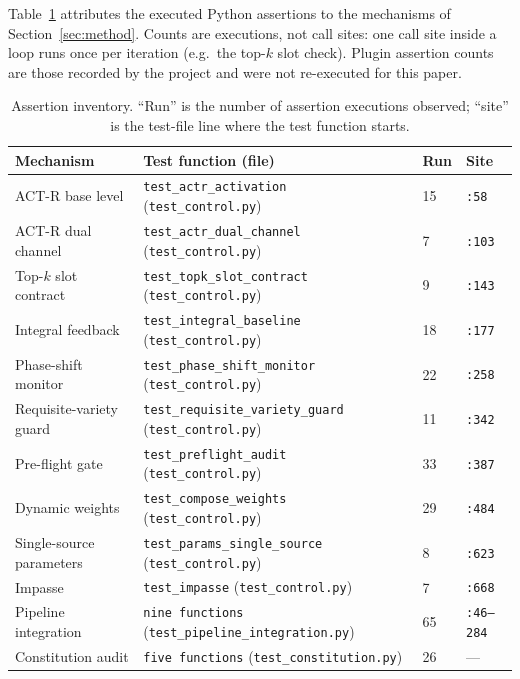 Table~\ref{tab:assertions} attributes the executed Python assertions to the
mechanisms of Section~\ref{sec:method}. Counts are executions, not call sites:
one call site inside a loop runs once per iteration (e.g.\ the top-$k$ slot
check). Plugin assertion counts are those recorded by the project and were not
re-executed for this paper.

\begin{table}[t]
\centering\scriptsize\setlength{\tabcolsep}{2.5pt}
\caption{Assertion inventory. ``Run'' is the number of assertion executions
observed; ``site'' is the test-file line where the test function starts.}\label{tab:assertions}
\begin{tabular}{@{}p{}p{}p{}p{}@{}}
\toprule
Mechanism & Test function (file) & Run & Site \\
\midrule
ACT-R base level & \texttt{test\_\allowbreak{}actr\_\allowbreak{}activation} (\texttt{test\_control.py}) & 15 & \texttt{:58} \\
ACT-R dual channel & \texttt{test\_\allowbreak{}actr\_\allowbreak{}dual\_\allowbreak{}channel} (\texttt{test\_control.py}) & 7 & \texttt{:103} \\
Top-$k$ slot contract & \texttt{test\_\allowbreak{}topk\_\allowbreak{}slot\_\allowbreak{}contract} (\texttt{test\_control.py}) & 9 & \texttt{:143} \\
Integral feedback & \texttt{test\_\allowbreak{}integral\_\allowbreak{}baseline} (\texttt{test\_control.py}) & 18 & \texttt{:177} \\
Phase-shift monitor & \texttt{test\_\allowbreak{}phase\_\allowbreak{}shift\_\allowbreak{}monitor} (\texttt{test\_control.py}) & 22 & \texttt{:258} \\
Requisite-variety guard & \texttt{test\_\allowbreak{}requisite\_\allowbreak{}variety\_\allowbreak{}guard} (\texttt{test\_control.py}) & 11 & \texttt{:342} \\
Pre-flight gate & \texttt{test\_\allowbreak{}preflight\_\allowbreak{}audit} (\texttt{test\_control.py}) & 33 & \texttt{:387} \\
Dynamic weights & \texttt{test\_\allowbreak{}compose\_\allowbreak{}weights} (\texttt{test\_control.py}) & 29 & \texttt{:484} \\
Single-source parameters & \texttt{test\_\allowbreak{}params\_\allowbreak{}single\_\allowbreak{}source} (\texttt{test\_control.py}) & 8 & \texttt{:623} \\
Impasse & \texttt{test\_impasse} (\texttt{test\_control.py}) & 7 & \texttt{:668} \\
Pipeline integration & \texttt{nine functions} (\texttt{test\_\allowbreak{}pipeline\_\allowbreak{}integration.\allowbreak{}py}) & 65 & \texttt{:46--284} \\
Constitution audit & \texttt{five functions} (\texttt{test\_\allowbreak{}constitution.\allowbreak{}py}) & 26 & --- \\
\bottomrule
\end{tabular}
\end{table}

